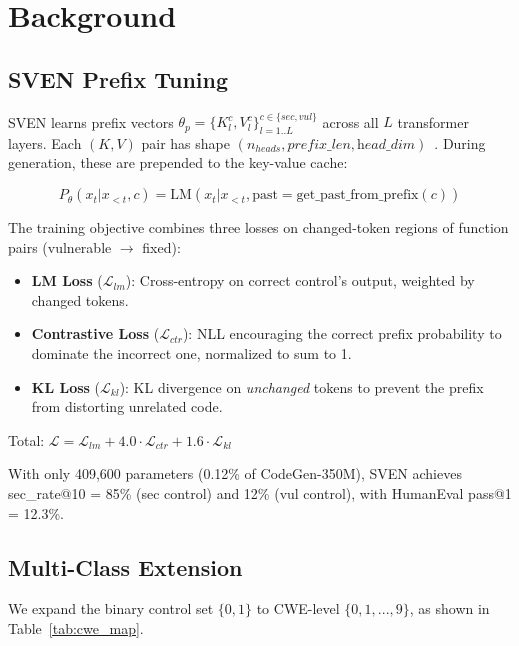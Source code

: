 \documentclass[conference]{IEEEtran}
\begin{document}
\section{Background}

\subsection{SVEN Prefix Tuning}

SVEN learns prefix vectors $\theta_p = \{K_l^c, V_l^c\}_{l=1..L}^{c \in \{sec, vul\}}$ across all $L$ transformer layers. Each $(K, V)$ pair has shape $(n_{heads}, \textit{prefix\_len}, \textit{head\_dim})$~\cite{li2021prefix}. During generation, these are prepended to the key-value cache:

\begin{equation}
P_\theta(x_t | x_{<t}, c) = \text{LM}(x_t | x_{<t}, \text{past} = \text{get\_past\_from\_prefix}(c))
\end{equation}

The training objective combines three losses on changed-token regions of function pairs (vulnerable $\rightarrow$ fixed):

\begin{itemize}
\item \textbf{LM Loss} ($\mathcal{L}_{lm}$): Cross-entropy on correct control's output, weighted by changed tokens.
\item \textbf{Contrastive Loss} ($\mathcal{L}_{ctr}$): NLL encouraging the correct prefix probability to dominate the incorrect one, normalized to sum to 1.
\item \textbf{KL Loss} ($\mathcal{L}_{kl}$): KL divergence on \textit{unchanged} tokens to prevent the prefix from distorting unrelated code.
\end{itemize}

Total: $\mathcal{L} = \mathcal{L}_{lm} + 4.0 \cdot \mathcal{L}_{ctr} + 1.6 \cdot \mathcal{L}_{kl}$

With only 409,600 parameters (0.12\% of CodeGen-350M), SVEN achieves sec\_rate@10 = 85\% (sec control) and 12\% (vul control), with HumanEval pass@1 = 12.3\%.

\subsection{Multi-Class Extension}

We expand the binary control set $\{0, 1\}$ to CWE-level $\{0, 1, ..., 9\}$, as shown in Table~\ref{tab:cwe_map}.
\end{document}

